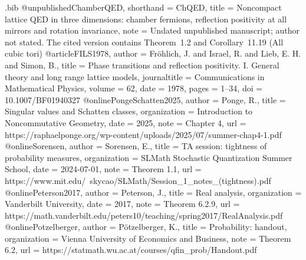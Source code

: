 \begin{filecontents*}[overwrite]{\jobname.bib}
@unpublished{ChamberQED,
  shorthand = {ChQED},
  title = {Noncompact lattice {QED} in three dimensions: chamber fermions,
    reflection positivity at all mirrors and rotation invariance},
  note = {Undated unpublished manuscript; author not stated.
    The cited version contains Theorem~1.2 and Corollary~11.19
    (All cubic tori)}
}
@article{FILS1978,
  author = {Fr\"ohlich, J. and Israel, R. and Lieb, E. H. and Simon, B.},
  title = {Phase transitions and reflection positivity.
    {I}. General theory and long range lattice models},
  journaltitle = {Communications in Mathematical Physics},
  volume = {62}, date = {1978}, pages = {1--34},
  doi = {10.1007/BF01940327}
}
@online{PongeSchatten2025,
  author = {Ponge, R.},
  title = {Singular values and {Schatten} classes},
  organization = {Introduction to Noncommutative Geometry},
  date = {2025}, note = {Chapter 4},
  url = {https://raphaelponge.org/wp-content/uploads/2025/07/summer-chap4-1.pdf}
}
@online{Sorensen,
  author = {Sorensen, E.},
  title = {{TA} session: tightness of probability measures},
  organization = {SLMath Stochastic Quantization Summer School},
  date = {2024-07-01}, note = {Theorem 1.1},
  url = {https://www.mit.edu/~skycao/SLMath/Session_1_notes_(tightness).pdf}
}
@online{Peterson2017,
  author = {Peterson, J.}, title = {Real analysis},
  organization = {Vanderbilt University}, date = {2017},
  note = {Theorem 6.2.9},
  url = {https://math.vanderbilt.edu/peters10/teaching/spring2017/RealAnalysis.pdf}
}
@online{Potzelberger,
  author = {P\"otzelberger, K.}, title = {Probability: handout},
  organization = {Vienna University of Economics and Business},
  note = {Theorem 6.2},
  url = {https://statmath.wu.ac.at/courses/qfin_prob/Handout.pdf}
}
\end{filecontents*}
\documentclass[11pt,letterpaper,reqno]{amsart}
\makeatletter
{}[2020/10/01]

\RequirePackage[T1]{fontenc}
\RequirePackage{lmodern}
\RequirePackage{microtype}
\RequirePackage[letterpaper,margin=1in,headheight=15pt]{geometry}
\RequirePackage{amsmath,amsthm,amssymb,mathtools}
\RequirePackage{enumitem}
\RequirePackage{perpage}
\RequirePackage{xcolor}
\RequirePackage[breaklinks=true,colorlinks=true,
  linkcolor=manuscriptred,citecolor=manuscriptcyan,urlcolor=manuscriptmagenta]{hyperref}
\RequirePackage{cleveref}


